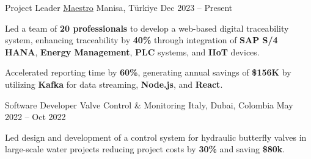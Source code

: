 

\begin{cventries}

  \cventry
    {Project Leader } %
{\underline{\href{https://drive.google.com/file/d/1H-QYalHNsmB5QA8nZN2AW8qQ9FgYeXjd/view?usp=sharing}{Maestro}}} %
    {Manisa, Türkiye} %
    {Dec 2023 – Present} %
    {
      \begin{cvitems} %
        \item {Led a team of \textbf{20 professionals} to develop a web-based digital traceability system, enhancing traceability by \textbf{40\%} through integration of \textbf{SAP S/4 HANA}, \textbf{Energy Management}, \textbf{PLC} systems, and \textbf{IIoT} devices.}
        \item {Accelerated reporting time by \textbf{60\%}, generating annual savings of \textbf{\$156K} by utilizing \textbf{Kafka} for data streaming, \textbf{Node.js}, and \textbf{React}.}
      \end{cvitems}
    }

  \cventry
    {Software Developer} %
    {Valve Control \& Monitoring} %
    {Italy, Dubai, Colombia} %
    {May 2022 – Oct 2022} %
    {
      \begin{cvitems} %
        \item {Led design and development of a control system for hydraulic butterfly valves in large-scale water projects reducing project costs by \textbf{30\%} and saving \textbf{\$80k}.}
      \end{cvitems}
    }

\end{cventries}
